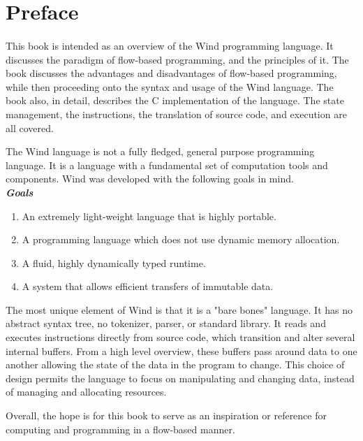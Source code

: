 
\section{Preface}

\paragraph{   } This book is intended as an overview of the Wind programming language. It discusses the paradigm of flow-based programming, and the principles of it. The book discusses the advantages and disadvantages of flow-based programming, while then proceeding onto the syntax and usage of the Wind language. The book also, in detail, describes the C implementation of the language. The state management, the instructions, the translation of source code, and execution are all covered. 

\par The Wind language is not a fully fledged, general purpose programming language. It is a language with a fundamental set of computation tools and components. Wind was developed with the following goals in mind. \\

\textbf{\emph{Goals}}
\begin{enumerate}
\item An extremely light-weight language that is highly portable.
\item A programming language which does not use dynamic memory allocation.
\item A fluid, highly dynamically typed runtime.
\item A system that allows efficient transfers of immutable data.
\end{enumerate}

\par The most unique element of Wind is that it is a "bare bones" language. It has no abstract syntax tree, no tokenizer, parser, or standard library. It reads and executes instructions directly from source code, which transition and alter several internal buffers. From a high level overview, these buffers pass around data to one another allowing the state of the data in the program to change. This choice of design permits the language to focus on manipulating and changing data, instead of managing and allocating resources.

\par Overall, the hope is for this book to serve as an inspiration or reference for computing and programming in a flow-based manner. 